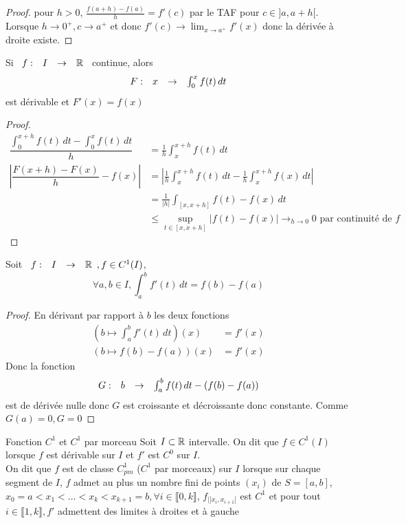 \documentclass[]{report}
\begin{document}
\begin{proof}
    pour $h>0$, $\frac{f(a+h)-f(a)}{h}=f'(c)$ par le TAF pour $c\in ]a,a+h[$.\\
    Lorsque $h\to 0^+, c\to a^+$ et donc $f'(c)\to \lim_{x\to a^+} f'(x)$ donc la dérivée à droite existe.
\end{proof}

\begin{prop}{}{}
    Si $\begin{array}{ccccc} f : & I & \to & \mathbb{R} \end{array}$ continue, alors
    \[\begin{array}{ccccc} F : & x & \to & \int_{0}^{x} f(t)\, dt \end{array}\]
    est dérivable et $F'(x)=f(x)$
\end{prop}

\begin{proof}
    \begin{align*}
        \dfrac{\int_{0}^{x+h} f(t)\, dt -\int_{0}^{x} f(t)\, dt}{h}&=\frac{1}{h} \int_{x}^{x+h}f(t)\, dt\\
        \left|\dfrac{F(x+h)-F(x)}{h}-f(x)\right|&= \left|\frac{1}{h} \int_{x}^{x+h} f(t)\, dt-\frac{1}{h} \int_{x}^{x+h} f(x)\, dt\right|\\
        &= \frac{1}{|h|}\int_{[x,x+h]} f(t)-f(x)\, dt\\
        &\le \sup_{t\in [x,x+h]} \left| f(t)-f(x)\right|\longrightarrow_{h\to 0}0\text{ par continuité de $f$}
    \end{align*}
\end{proof}

\begin{prop}{}{}
    Soit $\begin{array}{ccccc} f : & I & \to & \mathbb{R} \end{array},f\in C^1(I)$,
    \[\forall a,b\in I, \int_{a}^{b} f'(t)\, dt= f(b)-f(a)\]
\end{prop}

\begin{proof}
    En dérivant par rapport à $b$ les deux fonctions
    \begin{align*}
        (b\mapsto \int_{a}^{b} f'(t)\, dt)(x)&= f'(x)\\
        (b\mapsto f(b)-f(a))(x)&=f'(x)
    \end{align*}
    Donc la fonction
    \[\begin{array}{ccccc} G : & b & \to & \int_{a}^{b} f(t)\, dt -(f(b)-f(a)) \end{array}\]
    est de dérivée nulle donc $G$ est croissante et décroissante donc constante. Comme $G(a)=0,G=0$
\end{proof}

\begin{df}{Fonction $C^1$ et $C^1$ par morceau}{}
    Soit $I\subset \mathbb{R}$ intervalle. On dit que $f\in C^1(I)$ lorsque $f$ est dérivable sur $I$ et $f'$ est $C^0$ sur $I$.\\
    On dit que $f$ est de classe $C^1_{pm}$ ($C^1$ par morceaux) sur $I$ lorsque sur chaque segment de $I$, $f$ admet au plus un nombre fini de points $(x_i)$ de $S=[a,b]$, $x_0=a<x_1<\ldots< x_k <x_{k+1}=b,\forall i\in \llbracket 0,k\rrbracket$, $f_{|]x_i,x_{i+1}[}$ est $C^1$ et pour tout $i\in\llbracket 1,k\rrbracket,f'$ admettent des limites à droites et à gauche
\end{df}
\end{document}
